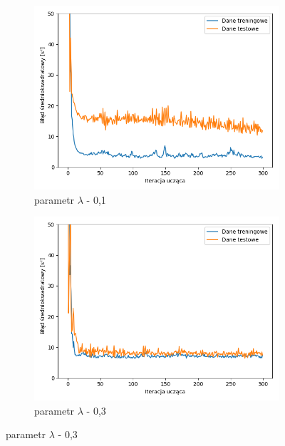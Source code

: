 \documentclass[12pt]{aghdpl}
\begin{document}
		\begin{figure}[h]
			\begin{subfigure}{.5\linewidth}
		 		\includegraphics[width =\linewidth]{wykresy/7_badanie_danych/l1/regularyzacja_0_1_wykres_uczenia.png}
		 		\caption{parametr $\lambda$ - 0,1}
		 	\end{subfigure}
		 	\begin{subfigure}{.5\linewidth}
		 		\includegraphics[width =\linewidth]{wykresy/7_badanie_danych/l1/regularyzacja_0_3_wykres_uczenia.png}
		 		\caption{parametr $\lambda$ - 0,3}
		 	\end{subfigure}
		 	

\end{figure}
\end{document}
